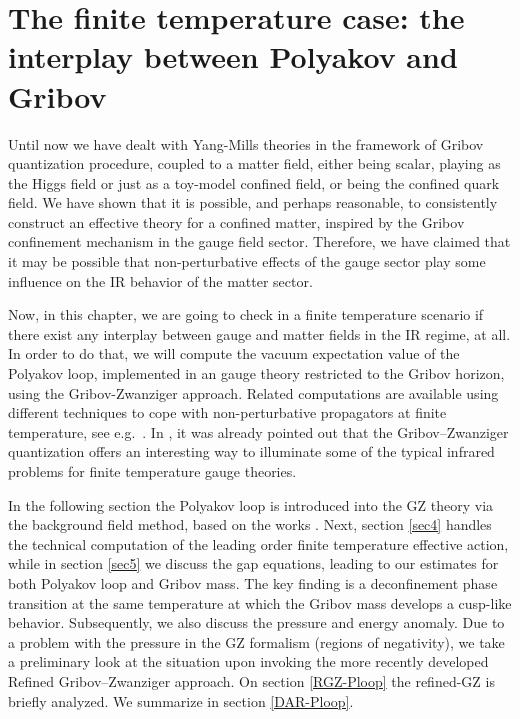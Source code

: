 

\chapter{The finite temperature case: the interplay between Polyakov and Gribov}
\label{Ploop1}


Until now we have dealt with Yang-Mills theories in the framework of Gribov quantization
procedure, coupled to a matter field, either being scalar, playing as the Higgs field or just
as a toy-model confined field, or being the confined quark field. We have shown that it is
possible, and perhaps reasonable, to consistently construct an effective theory for a confined
matter, inspired by the Gribov confinement mechanism in the gauge field sector.
Therefore, we have claimed that it may be possible that non-perturbative effects of the gauge
sector play some influence on the IR behavior of the matter sector.

Now, in this chapter, we are going to check in a finite temperature scenario if there exist any
interplay between gauge and matter fields in the IR regime, at all. In order to do that, we
will compute the vacuum expectation value of the Polyakov loop, implemented in an gauge
theory restricted to the Gribov horizon, using the Gribov-Zwanziger approach. 
Related computations are available using different techniques to cope with non-perturbative
propagators at finite temperature, see
e.g.~\cite{Maas:2011se,Braun:2007bx,Marhauser:2008fz,Reinhardt:2012qe,Reinhardt:2013iia,Heffner:2015zna,Reinosa:2014ooa,Reinosa:2014zta,Fischer:2009gk,Herbst:2013ufa,Bender:1996bm}.
In \cite{Zwanziger:2006sc,Lichtenegger:2008mh,Fukushima:2013xsa}, it was already
pointed out that the Gribov--Zwanziger quantization offers an interesting way to illuminate
some of the typical infrared problems for finite temperature gauge theories.

In the following section the Polyakov loop is introduced into the GZ theory via the
background field method, based on the works
\cite{Braun:2007bx,Marhauser:2008fz,Reinosa:2014ooa}. Next, section \ref{sec4} handles the
technical computation of the leading order finite temperature effective action, while in
section \ref{sec5} we discuss the gap equations, leading to our estimates for both Polyakov
loop and Gribov mass. The key finding is a deconfinement phase transition at the same
temperature at which the Gribov mass develops a cusp-like behavior. Subsequently, we also
discuss the pressure and energy anomaly. Due to a problem with the pressure in the GZ formalism
(regions of negativity), we take a preliminary look at the situation upon invoking the more
recently developed Refined Gribov--Zwanziger approach. On section \ref{RGZ-Ploop} the
refined-GZ is briefly analyzed.  We summarize in section \ref{DAR-Ploop}.



